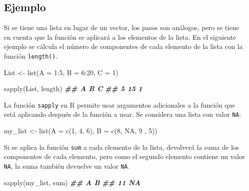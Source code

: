 \documentclass[
]{book}
\newenvironment{Shaded}{\begin{snugshade}}{\end{snugshade}}
\newcommand{\AttributeTok}[1]{\textcolor[rgb]{0.77,0.63,0.00}{#1}}
\newcommand{\ConstantTok}[1]{\textcolor[rgb]{0.00,0.00,0.00}{#1}}
\newcommand{\DecValTok}[1]{\textcolor[rgb]{0.00,0.00,0.81}{#1}}
\newcommand{\DocumentationTok}[1]{\textcolor[rgb]{0.56,0.35,0.01}{\textbf{\textit{#1}}}}
\newcommand{\FunctionTok}[1]{\textcolor[rgb]{0.00,0.00,0.00}{#1}}
\newcommand{\NormalTok}[1]{#1}
\newcommand{\OtherTok}[1]{\textcolor[rgb]{0.56,0.35,0.01}{#1}}
\newcommand{\SpecialCharTok}[1]{\textcolor[rgb]{0.00,0.00,0.00}{#1}}
\begin{document}
\hypertarget{ejemplo-21}{%
\subsection*{Ejemplo}\label{ejemplo-21}}

Si se tiene una lista en lugar de un vector, los pasos son análogos, pero se tiene en cuenta que la función se aplicará a los elementos de la lista. En el siguiente ejemplo se cálcula el número de componentes de cada elemento de la lista con la función \texttt{length()}.

\begin{Shaded}
\begin{Highlighting}[]
\NormalTok{List }\OtherTok{\textless{}{-}} \FunctionTok{list}\NormalTok{(}\AttributeTok{A =} \DecValTok{1}\SpecialCharTok{:}\DecValTok{5}\NormalTok{, }\AttributeTok{B =} \DecValTok{6}\SpecialCharTok{:}\DecValTok{20}\NormalTok{, }\AttributeTok{C =} \DecValTok{1}\NormalTok{)}

\FunctionTok{sapply}\NormalTok{(List, length)}
\DocumentationTok{\#\#  A  B  C }
\DocumentationTok{\#\#  5 15  1}
\end{Highlighting}
\end{Shaded}

La función \texttt{sapply} en R permite usar argumentos adicionales a la función que está aplicando después de la función a usar. Se considera una lista con valor \texttt{NA}:

\begin{Shaded}
\begin{Highlighting}[]
\NormalTok{my\_list }\OtherTok{\textless{}{-}} \FunctionTok{list}\NormalTok{(}\AttributeTok{A =} \FunctionTok{c}\NormalTok{(}\DecValTok{1}\NormalTok{, }\DecValTok{4}\NormalTok{, }\DecValTok{6}\NormalTok{), }\AttributeTok{B =} \FunctionTok{c}\NormalTok{(}\DecValTok{8}\NormalTok{, }\ConstantTok{NA}\NormalTok{, }\DecValTok{9}\NormalTok{ , }\DecValTok{5}\NormalTok{))}
\end{Highlighting}
\end{Shaded}

Si se aplica la función \texttt{sum} a cada elemento de la lista, devolverá la suma de los componentes de cada elemento, pero como el segundo elemento contiene un valor \texttt{NA}, la suma también devuelve un valor \texttt{NA}.

\begin{Shaded}
\begin{Highlighting}[]
\FunctionTok{sapply}\NormalTok{(my\_list, sum)}
\DocumentationTok{\#\#  A  B }
\DocumentationTok{\#\# 11 NA}
\end{Highlighting}
\end{Shaded}
\end{document}
